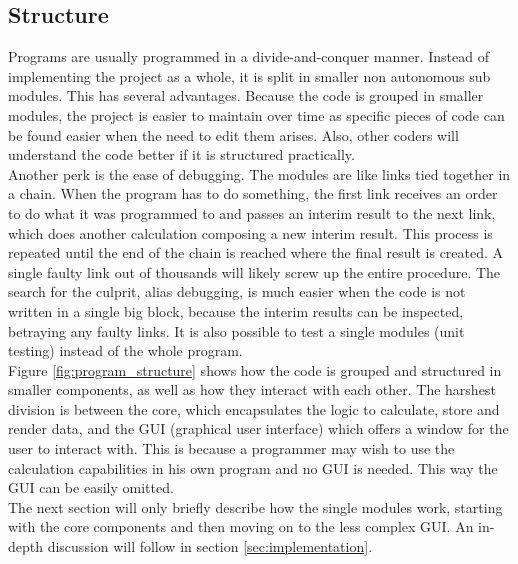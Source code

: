 \documentclass[10pt,a4paper,titlepage]{article}
\begin{document}
	\subsection{Structure}
	Programs are usually programmed in a divide-and-conquer manner. Instead of implementing the project as a whole, it is split in smaller non autonomous sub modules. This has several advantages. Because the code is grouped in smaller modules, the project is easier to maintain over time as specific pieces of code can be found easier when the need to edit them arises. Also, other coders will understand the code better if it is structured practically.\\
	Another perk is the ease of debugging. The modules are like links tied together in a chain. When the program has to do something, the first link receives an order to do what it was programmed to and passes an interim result to the next link, which does another calculation composing a new interim result. This process is repeated until the end of the chain is reached where the final result is created. A single faulty link out of thousands will likely screw up the entire procedure. The search for the culprit, alias debugging, is much easier when the code is not written in a single big block, because the interim results can be inspected, betraying any faulty links. It is also possible to test a single modules (unit testing) instead of the whole program.\\
	Figure \ref{fig:program_structure} shows how the code is grouped and structured in smaller components, as well as how they interact with each other. The harshest division is between the core, which encapsulates the logic to calculate, store and render data, and the GUI (graphical user interface) which offers a window for the user to interact with. This is because a programmer may wish to use the calculation capabilities in his own program and no GUI is needed. This way the GUI can be easily omitted.\\
	The next section will only briefly describe how the single modules work, starting with the core components and then moving on to the less complex GUI. An in-depth discussion will follow in section \ref{sec:implementation}.
\end{document}
